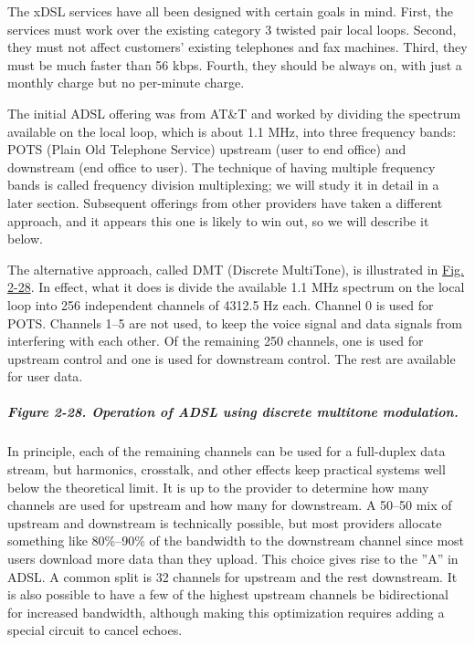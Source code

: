 \documentclass[b5paper,11pt]{memoir}
\begin{document}
The xDSL services have all been designed with certain goals in mind.
First, the services must work over the existing category 3 twisted pair
local loops. Second, they must not affect customers' existing telephones
and fax machines. Third, they must be much faster than 56 kbps. Fourth,
they should be always on, with just a monthly charge but no per-minute
charge.

The initial ADSL offering was from AT\&T and worked by dividing the
spectrum available on the local loop, which is about 1.1 MHz, into three
frequency bands: {POTS} ({Plain Old Telephone Service}) upstream (user
to end office) and downstream (end office to user). The technique of
having multiple frequency bands is called frequency division
multiplexing; we will study it in detail in a later section. Subsequent
offerings from other providers have taken a different approach, and it
appears this one is likely to win out, so we will describe it below.

The alternative approach, called {DMT} ({Discrete MultiTone}), is
illustrated in
\protect\hyperlink{0130661023_ch02lev1sec5.htmlux5cux23ch02fig28}{Fig.
2-28}. In effect, what it does is divide the available 1.1 MHz spectrum
on the local loop into 256 independent channels of 4312.5 Hz each.
Channel 0 is used for POTS. Channels 1--5 are not used, to keep the
voice signal and data signals from interfering with each other. Of the
remaining 250 channels, one is used for upstream control and one is used
for downstream control. The rest are available for user data.

\subparagraph[Figure 2-28. Operation of ADSL using discrete multitone
modulation.]{\texorpdfstring{\protect\hypertarget{0130661023_ch02lev1sec5.htmlux5cux23ch02fig28}{}{}Figure
2-28. Operation of ADSL using discrete multitone
modulation.}{Figure 2-28. Operation of ADSL using discrete multitone modulation.}}


In principle, each of the remaining channels can be used for a
full-duplex data stream, but harmonics, crosstalk, and other effects
keep practical systems well below the theoretical limit. It is up to the
provider to determine how many channels are used for upstream and how
many for downstream. A 50--50 mix of upstream and downstream is
technically possible, but most providers allocate something like
80\%--90\% of the bandwidth to the downstream channel since most users
download more data than they upload. This choice gives rise to the ''A''
in ADSL. A common split is 32 channels for upstream and the rest
downstream. It is also possible to have a few of the highest upstream
channels be bidirectional for increased bandwidth, although making this
optimization requires adding a special circuit to cancel echoes.
\end{document}
